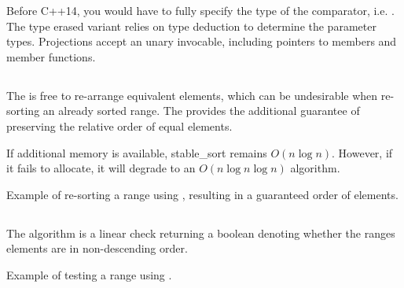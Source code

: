 Before C++14, you would have to fully specify the type of the comparator, i.e. . The type erased variant  relies on type deduction to determine the parameter types. Projections accept an unary invocable, including pointers to members and member functions.

\subsection{\texorpdfstring{}{\texttt{std::stable\_sort}}}

The  is free to re-arrange equivalent elements, which can be undesirable when re-sorting an already sorted range. The  provides the additional guarantee of preserving the relative order of equal elements.


If additional memory is available, stable\_sort remains $O(n\log n)$. However, if it fails to allocate, it will degrade to an $O(n\log n\log n)$ algorithm.

\begin{codebox}[]{\href{https://compiler-explorer.com/z/TKx8qP8bK}{\ExternalLink}}
\footnotesize Example of re-sorting a range using , resulting in a guaranteed order of elements.
\tcblower
{}
\end{codebox}

\subsection{\texorpdfstring{}{\texttt{std::is\_sorted}}}

The  algorithm is a linear check returning a boolean denoting whether the ranges elements are in non-descending order.


\begin{codebox}[]{\href{https://compiler-explorer.com/z/T3n9bfqdM}{\ExternalLink}}
\footnotesize Example of testing a range using .
\tcblower
{}
\end{codebox}

